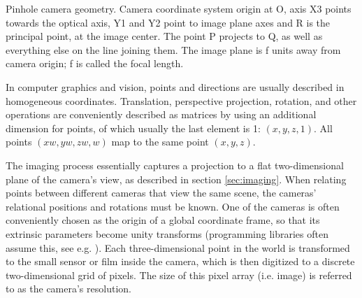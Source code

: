 {Pinhole camera geometry. Camera coordinate system origin at O, axis X3 points towards the optical axis, Y1 and Y2 point to image plane axes and R is the principal point, at the image center. The point P projects to Q, as well as everything else on the line joining them. The image plane is f units away from camera origin; f is called the focal length.}

In computer graphics and vision, points and directions are usually described in homogeneous coordinates.
Translation, perspective projection, rotation, and other operations are conveniently described as matrices by using an additional dimension for points, of which usually the last element is 1: $(x, y, z, 1)$.
All points $(xw, yw, zw, w)$ map to the same point $(x, y, z)$.
\cite{dubrofsky2009homography,hartley03multiview}


The imaging process essentially captures a projection to a flat two-dimensional plane of the camera's view, as described in section \ref{sec:imaging}.
When relating points between different cameras that view the same scene, the cameras' relational positions and rotations must be known.
One of the cameras is often conveniently chosen as the origin of a global coordinate frame, so that its extrinsic parameters become unity transforms (programming libraries often assume this, see e.g. \cite{opencv}).
Each three-dimensional point in the world is transformed to the small sensor or film inside the camera, which is then digitized to a discrete two-dimensional grid of pixels. The size of this pixel array (i.e. image) is referred to as the camera's resolution.


